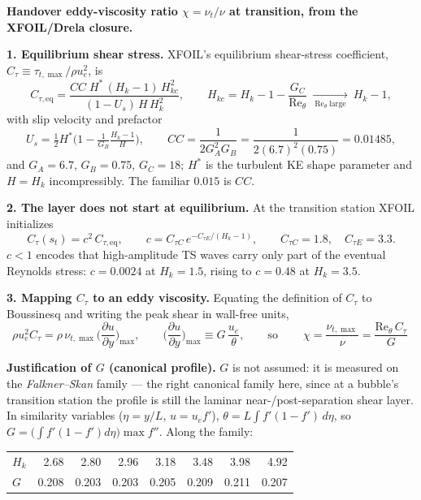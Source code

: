 \documentclass[10pt]{article}
\newcommand{\Ret}{\mathrm{Re}_\theta}
\newcommand{\Hk}{H_k}
\begin{document}
\textbf{Handover eddy-viscosity ratio $\chi=\nu_t/\nu$ at transition, from the
XFOIL/Drela closure.}

\textbf{1. Equilibrium shear stress.} XFOIL's equilibrium shear-stress
coefficient, $C_\tau\equiv\tau_{t,\max}/\rho u_e^2$, is
\[
C_{\tau,\mathrm{eq}}
=\frac{CC\;H^{*}\,(\Hk-1)\,H_{kc}^{2}}{(1-U_s)\,H\,\Hk^{2}},
\qquad
H_{kc}=\Hk-1-\frac{G_C}{\Ret}\ \xrightarrow[\ \Ret\ \text{large}\ ]{}\ \Hk-1,
\]
with slip velocity and prefactor
\[
U_s=\tfrac12 H^{*}\Big(1-\tfrac{1}{G_B}\tfrac{\Hk-1}{H}\Big),
\qquad
CC=\frac{1}{2G_A^{2}G_B}=\frac{1}{2(6.7)^2(0.75)}=0.01485 ,
\]
and $G_A=6.7$, $G_B=0.75$, $G_C=18$; $H^{*}$ is the turbulent KE shape
parameter and $H=\Hk$ incompressibly. The familiar $0.015$ is $CC$.

\textbf{2. The layer does not start at equilibrium.} At the transition station
XFOIL initializes
\[
C_\tau(s_t)=c^{2}\,C_{\tau,\mathrm{eq}},
\qquad
c=C_{\tau C}\,e^{-C_{\tau E}/(\Hk-1)},
\qquad C_{\tau C}=1.8,\quad C_{\tau E}=3.3 .
\]
$c<1$ encodes that high-amplitude TS waves carry only part of the eventual
Reynolds stress: $c=0.0024$ at $\Hk=1.5$, rising to $c=0.48$ at $\Hk=3.5$.

\textbf{3. Mapping $C_\tau$ to an eddy viscosity.} Equating the definition of
$C_\tau$ to Boussinesq and writing the peak shear in wall-free units,
\[
\rho u_e^{2}C_\tau=\rho\,\nu_{t,\max}\Big(\frac{\partial u}{\partial y}\Big)_{\max},
\qquad
\Big(\frac{\partial u}{\partial y}\Big)_{\max}\equiv G\,\frac{u_e}{\theta},
\qquad\text{so}\qquad
\boxed{\ \chi=\frac{\nu_{t,\max}}{\nu}=\frac{\Ret\,C_\tau}{G}\ }
\]

\textbf{Justification of $G$ (canonical profile).} $G$ is not assumed: it is
measured on the \emph{Falkner--Skan} family --- the right canonical family here,
since at a bubble's transition station the profile is still the laminar
near-/post-separation shear layer. In similarity variables ($\eta=y/L$,
$u=u_e f'$), $\theta=L\!\int\! f'(1-f')\,d\eta$, so
$G=\big(\!\int\! f'(1-f')d\eta\big)\max f''$. Along the family:

\vspace{-5pt}\begin{center}\small
\begin{tabular}{lrrrrrrr}
\toprule
$\Hk$ & 2.68 & 2.80 & 2.96 & 3.18 & 3.48 & 3.98 & 4.92\\
$G$   & 0.208& 0.203& 0.203& 0.205& 0.209& 0.211& 0.207\\
\bottomrule
\end{tabular}
\end{center}\vspace{-7pt}
\end{document}
